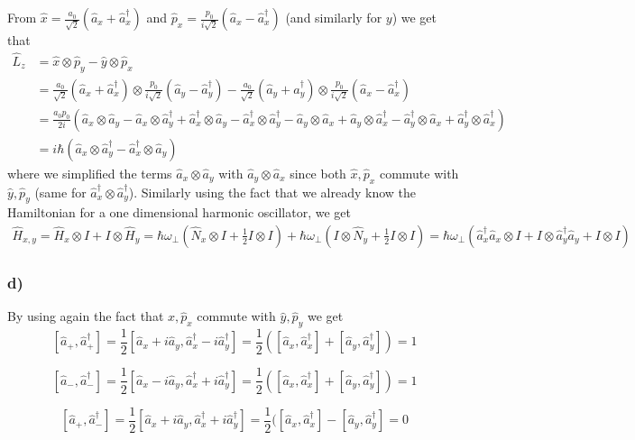 \documentclass[10pt,a4paper]{book}
\begin{document}
From $\hat{x}=\frac{a_0}{\sqrt{2}}(\hat{a}_x+\hat{a}^{\dagger}_x)$ and $\hat{p}_x=\frac{p_0}{i\sqrt{2}}(\hat{a}_x-\hat{a}^{\dagger}_x)$ (and similarly for $y$) we get that
\begin{align*}
\hat{L}_z&=\hat{x}\otimes \hat{p}_y-\hat{y}\otimes\hat{p}_x\\
&=\frac{a_0}{\sqrt{2}}(\hat{a}_x+\hat{a}^{\dagger}_x)\otimes \frac{p_0}{i\sqrt{2}}(\hat{a}_y-\hat{a}^{\dagger}_y)-\frac{a_0}{\sqrt{2}}(\hat{a}_y+\hat{a}^{\dagger}_y)\otimes \frac{p_0}{i\sqrt{2}}(\hat{a}_x-\hat{a}^{\dagger}_x)\\
&=\frac{a_0p_0}{2i}(\hat{a}_x\otimes \hat{a}_y-\hat{a}_x\otimes \hat{a}_y^{\dagger}+\hat{a}_x^{\dagger}\otimes \hat{a}_y-\hat{a}_x^{\dagger}\otimes \hat{a}_y^{\dagger}-\hat{a}_y\otimes \hat{a}_x+\hat{a}_y\otimes \hat{a}_x^{\dagger}-\hat{a}_y^{\dagger}\otimes \hat{a}_x+\hat{a}_y^{\dagger}\otimes \hat{a}_x^{\dagger})\\
&=i\hbar(\hat{a}_x\otimes \hat{a}_y^{\dagger}-\hat{a}^{\dagger}_x\otimes \hat{a}_y)
\end{align*}
where we simplified the terms $\hat{a}_x\otimes \hat{a}_y$ with $\hat{a}_y\otimes \hat{a}_x$ since both $\hat{x},\hat{p}_x$ commute with $\hat{y},\hat{p}_y$ (same for $\hat{a}_x^{\dagger}\otimes \hat{a}_y^{\dagger}$).
Similarly using the fact that we already know the Hamiltonian for a one dimensional harmonic oscillator, we get
\begin{align*}
\hat{H}_{x,y}=\hat{H}_x\otimes I+I\otimes\hat{H}_y=\hbar\omega_{\perp}(\hat{N}_x\otimes I+\frac{1}{2}I\otimes I)+\hbar\omega_{\perp}(I\otimes \hat{N}_y+\frac{1}{2} I\otimes I)=\hbar\omega_{\perp}(\hat{a}_x^{\dagger}\hat{a}_x\otimes I+I\otimes \hat{a}_y^{\dagger}\hat{a}_y +I\otimes I)
\end{align*}

\subsubsection{d)}
By using again the fact that $\hat{x},\hat{p}_x$ commute with $\hat{y},\hat{p}_y$ we get 
$$[\hat{a}_+,\hat{a}_+^{\dagger}]=\frac{1}{2}[\hat{a}_x+i\hat{a}_y,\hat{a}_x^{\dagger}-i\hat{a}^{\dagger}_y]=\frac{1}{2}([\hat{a}_x,\hat{a}_x^{\dagger}]+[\hat{a}_y,\hat{a}_y^{\dagger}])=1$$

$$[\hat{a}_-,\hat{a}_-^{\dagger}]=\frac{1}{2}[\hat{a}_x-i\hat{a}_y,\hat{a}_x^{\dagger}+i\hat{a}^{\dagger}_y]=\frac{1}{2}([\hat{a}_x,\hat{a}_x^{\dagger}]+[\hat{a}_y,\hat{a}_y^{\dagger}])=1$$


$$[\hat{a}_+,\hat{a}_-^{\dagger}]=\frac{1}{2}[\hat{a}_x+i\hat{a}_y,\hat{a}_x^{\dagger}+i\hat{a}^{\dagger}_y]=\frac{1}{2}([\hat{a}_x,\hat{a}_x^{\dagger}]-[\hat{a}_y,\hat{a}_y^{\dagger}]=0$$
\end{document}
